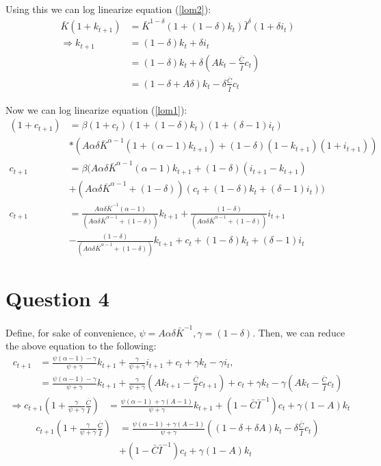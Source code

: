 \documentclass[11pt]{article} %
\begin{document}
Using this we can log linearize equation (\ref{lom2}):
\begin{align*}
\bar{K}(1+k_{t+1}) &= \bar{K}^{1-\delta}(1+(1-\delta)k_t)\bar{I}^{\delta}(1+\delta i_t)\\
\Rightarrow k_{t+1} &= (1-\delta)k_t + \delta i_t\\
&= (1-\delta)k_t + \delta \left( Ak_t - \frac{\bar{C}}{\bar{I}}c_t \right)\\
&= (1-\delta + A\delta) k_t - \delta\frac{\bar{C}}{\bar{I}}c_t
\end{align*}

Now we can log linearize equation (\ref{lom1}):
\begin{align*}
(1+c_{t+1}) &= \beta (1+c_{t}) (1+(1-\delta)k_t) (1+(\delta - 1)i_t)\\ &*(A\alpha \delta \bar{K}^{\alpha - 1}(1+(\alpha -1)k_{t+1}) + (1-\delta)(1-k_{t+1})(1+i_{t+1}))\\
c_{t+1} &= \beta (A\alpha\delta\bar{K}^{\alpha-1}(\alpha - 1)k_{t+1} + (1-\delta)(i_{t+1} - k_{t+1})\\ &+ (A\alpha\delta\bar{K}^{\alpha-1} + (1-\delta))(c_t + (1-\delta)k_t + (\delta - 1)i_t))\\
c_{t+1} &= \frac{A\alpha \delta \bar{K}^{-1}(\alpha -1)}{(A\alpha\delta\bar{K}^{\alpha-1} + (1-\delta))}k_{t+1} +  \frac{ (1-\delta)}{(A\alpha\delta\bar{K}^{\alpha-1} + (1-\delta))} i_{t+1} \\
&-   \frac{ (1-\delta)}{(A\alpha\delta\bar{K}^{\alpha-1} + (1-\delta))} k_{t+1} + c_t + (1-\delta)k_t + (\delta - 1)i_t
\end{align*}

\section{Question 4}
Define, for sake of convenience, $\psi = A\alpha\delta \bar{K}^{-1}, \gamma = (1-\delta)$. Then, we can reduce the above equation to the following:
\begin{align*}
c_{t+1} &= \frac{\psi (\alpha - 1) - \gamma}{\psi + \gamma}k_{t+1} + \frac{\gamma}{\psi + \gamma}i_{t+1} + c_t + \gamma k_t - \gamma i_t,\\
&= \frac{\psi (\alpha - 1) - \gamma}{\psi + \gamma}k_{t+1} + \frac{\gamma}{\psi + \gamma}\left(Ak_{t+1} - \frac{\bar{C}}{\bar{I}}c_{t+1} \right)  + c_t + \gamma k_t - \gamma \left( Ak_t - \frac{\bar{C}}{\bar{I}}c_t \right)
\end{align*}
\begin{align*}
\Rightarrow c_{t+1}\left( 1 + \frac{\gamma}{\psi + \gamma} \frac{\bar{C}}{\bar{I}}\right) &=  \frac{\psi (\alpha - 1) + \gamma(A - 1)}{\psi + \gamma}k_{t+1}   +(1 - \bar{C}\bar{I}^{-1}) c_t +  \gamma\left( 1-A \right)k_t 
\end{align*}
\begin{align*}
c_{t+1} \left( 1 + \frac{\gamma}{\psi + \gamma} \frac{\bar{C}}{\bar{I}}\right) &= \frac{\psi (\alpha - 1) + \gamma(A - 1)}{\psi + \gamma}\left( \left(1 - \delta + \delta A\right)k_t - \delta\frac{\bar{C}}{\bar{I}}c_t \right)\\ &+(1 - \bar{C}\bar{I}^{-1}) c_t +  \gamma\left( 1-A \right)k_t 
\end{align*}
\end{document}
